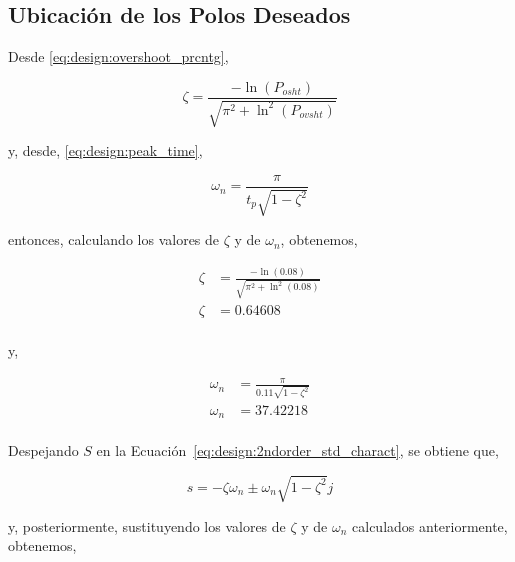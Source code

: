 \documentclass[12pt,a4paper]{article}
\begin{document}
      \subsection{Ubicación de los Polos Deseados}

        Desde \ref{eq:design:overshoot_prcntg}, 

        \begin{equation}
        \zeta = \frac{-\ln\left(P_{osht}\right)}{\sqrt{\pi^{2} + \ln^{2}\left(P_{ovsht}\right)}}
        \end{equation}

        y, desde, \ref{eq:design:peak_time}, 

        \begin{equation}
          \omega_{n} = \frac{\pi}{t_{p}\sqrt{1-\zeta^{2}}}
        \end{equation}
        
        entonces, calculando los valores de $ \zeta $ y de $ \omega_{n} $, obtenemos, 

        \begin{equation*}
          \begin{aligned}
            \zeta &= \frac{-\ln\left(0.08\right)}{\sqrt{\pi^{2} + \ln^{2}\left(0.08\right)}} \\
            \zeta &= 0.64608 \\
          \end{aligned}
        \end{equation*}

        y, 

        \begin{equation*}
          \begin{aligned}
            \omega_{n} &= \frac{\pi}{0.11\sqrt{1-\zeta^{2}}} \\ 
            \omega_{n} &= 37.42218 \\
          \end{aligned}
        \end{equation*}
        
        Despejando $ S $ en la Ecuación~\ref{eq:design:2ndorder_std_charact}, se obtiene que, 

        \begin{equation}
          s = -\zeta\omega_{n} \pm \omega_{n}\sqrt{1 - \zeta^{2}}j
          \label{eq:design:charact_sval}
        \end{equation}

        y, posteriormente, sustituyendo los valores de $ \zeta $ y de $ \omega_{n} $ calculados anteriormente, 
        obtenemos,
\end{document}
